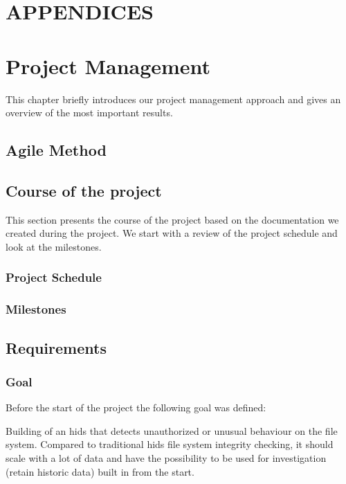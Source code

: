 
\chapter*{APPENDICES}

\begingroup\let\clearpage\relax
\chapter{Project Management}
\label{apdx-ch:pm}
\endgroup

This chapter briefly introduces our project management approach and gives an overview of the most important results.



\section{Agile Method}
\label{apdx-sec:agile-method}

\section{Course of the project}
\label{apdx-sec:project_course}
This section presents the course of the project based on the documentation we created during the project. We start with a review of the project schedule and look at the milestones.

\subsection{Project Schedule}

\subsection{Milestones}

\section{Requirements}
\label{apdx-sec:requirements}

\subsection{Goal}
Before the start of the project the following goal was defined:

Building of an \gls{hids} that detects unauthorized or unusual behaviour on the file system. Compared to traditional \gls{hids} file system integrity checking, it should scale with a lot of data and have the possibility to be used for investigation (retain historic data) built in from the start.


